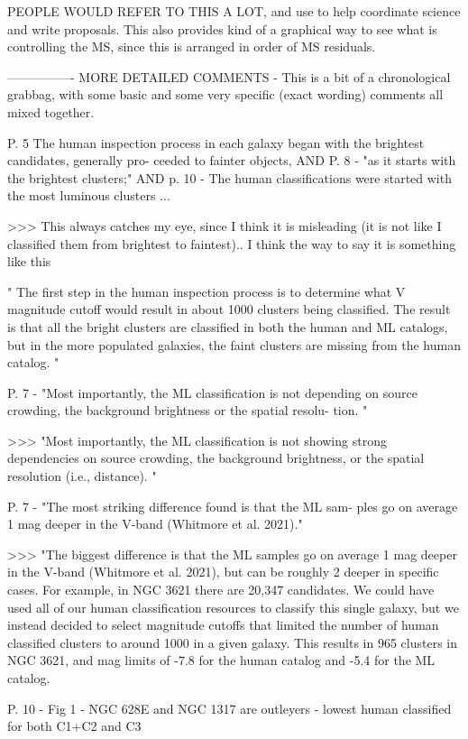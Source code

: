 PEOPLE WOULD REFER TO THIS A LOT, and use to help coordinate science and write proposals. This also provides kind of a graphical way to see what is controlling the MS, since this is arranged in order of MS residuals.
 
----------------
MORE DETAILED COMMENTS - This is a bit of a chronological grabbag, with some basic and some very specific (exact wording) comments all mixed together.
 
P. 5 The human inspection process in each galaxy began with the brightest candidates, generally pro- ceeded to fainter objects, AND P. 8 - "as it starts with the brightest clusters;" AND p. 10 - The human classifications were started with the most luminous clusters ...
 
>>> This always catches my eye, since I think it is misleading (it is not like I classified them from brightest to faintest).. I think the way to say it is something like this
 
" The first step in the human inspection process is to determine what V magnitude cutoff would result in about 1000 clusters being classified. The result is that all the bright clusters are classified in both the human and ML catalogs, but in the more populated galaxies, the faint clusters are missing from the human catalog. "
 
 
P. 7 - "Most importantly, the ML classification is not depending on source
crowding, the background brightness or the spatial resolu-
tion. "
 
>>> "Most importantly, the ML classification is not showing strong dependencies on source
crowding, the background brightness, or the spatial resolution (i.e., distance). "
 
P. 7 - "The most striking difference found is that the ML sam-
ples go on average 1 mag deeper in the V-band (Whitmore
et al. 2021)."
 
>>> "The biggest difference is that the ML samples go on average 1 mag deeper in the V-band (Whitmore
et al. 2021), but can be roughly 2 deeper in specific cases. For example, in NGC 3621 there are 20,347 candidates. We could have used all of our human classification resources to classify this single galaxy, but we instead decided to select magnitude cutoffs that limited the number of human classified clusters to around 1000 in a given galaxy. This results in 965 clusters in NGC 3621, and  mag limits of -7.8 for the human catalog and -5.4 for the ML catalog.
 
P. 10 - Fig 1 - NGC 628E and NGC 1317 are outleyers -  lowest human classified for  both C1+C2 and C3
 
